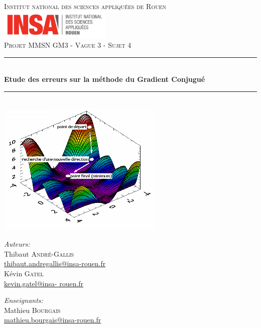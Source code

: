 \documentclass[12,french]{report}
\newcommand{\HRule}{\rule{\linewidth}{0.5mm}}
\begin{document}
\hypersetup{pdfborder=0 0 0}

\begin{titlepage}

\begin{center}
	\textsc{\LARGE Institut national des sciences appliquées de Rouen} 
	\vspace{5mm}\\
	\includegraphics[width=0.4\textwidth]{./Images/insa}\\[1.0 cm]

	\textsc{\Large Projet MMSN GM3 - Vague 3 - Sujet 4}\\[0.6cm]

	\HRule \\[0.5cm]
	{ \Huge \bfseries Etude des erreurs sur la méthode du Gradient Conjugué}\\[0.2cm]
	\HRule \\[0.75cm]

	\includegraphics[width=0.6\textwidth]{./Images/Page_de_garde}\\[0.9 cm]

	\begin{minipage}{0.4\textwidth}
		\begin{flushleft} \large
			\emph{Auteurs:}\\
			Thibaut \textsc{André-Gallis} \\
			{\small\href{mailto:thibaut.andregallis@insa-rouen.fr}{thibaut.andregallis@insa-rouen.fr}} \\
			Kévin \textsc{Gatel} \\
			{\small\href{mailto:kevin.gatel@insa-rouen.fr}{kevin.gatel@insa-				rouen.fr}}
		\end{flushleft}
	\end{minipage}
	\begin{minipage}{0.4\textwidth}
		\begin{flushright} \large
			\emph{Enseignants:} \\
			Mathieu \textsc{Bourgais} \\
			{\small\href{mailto:mathieu.bourgais@insa-rouen.fr}								{mathieu.bourgais@insa-rouen.fr}}\\
		\end{flushright}
	\end{minipage}


\end{center}
\end{titlepage}
\end{document}
